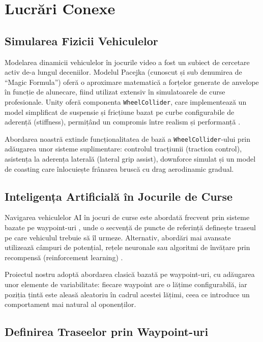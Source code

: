 \section{Lucrări Conexe}
\label{sec:related_work}

\subsection{Simularea Fizicii Vehiculelor}

Modelarea dinamicii vehiculelor în jocurile video a fost un subiect de cercetare activ de-a lungul deceniilor. Modelul Pacejka (cunoscut și sub denumirea de ``Magic Formula'') \cite{pacejka2012tire} oferă o aproximare matematică a forțelor generate de anvelope în funcție de alunecare, fiind utilizat extensiv în simulatoarele de curse profesionale. Unity oferă componenta \texttt{WheelCollider}, care implementează un model simplificat de suspensie și fricțiune bazat pe curbe configurabile de aderență (stiffness), permițând un compromis între realism și performanță \cite{unity_manual_wheelcollider}.

Abordarea noastră extinde funcționalitatea de bază a \texttt{WheelCollider}-ului prin adăugarea unor sisteme suplimentare: controlul tracțiunii (traction control), asistența la aderența laterală (lateral grip assist), downforce simulat și un model de coasting care înlocuiește frânarea bruscă cu drag aerodinamic gradual.

\subsection{Inteligența Artificială în Jocurile de Curse}

Navigarea vehiculelor AI în jocuri de curse este abordată frecvent prin sisteme bazate pe waypoint-uri \cite{rabin2009introduction}, unde o secvență de puncte de referință definește traseul pe care vehiculul trebuie să îl urmeze. Alternativ, abordări mai avansate utilizează câmpuri de potențial, rețele neuronale sau algoritmi de învățare prin recompensă (reinforcement learning) \cite{julian2019deep}.

Proiectul nostru adoptă abordarea clasică bazată pe waypoint-uri, cu adăugarea unor elemente de variabilitate: fiecare waypoint are o lățime configurabilă, iar poziția țintă este aleasă aleatoriu în cadrul acestei lățimi, ceea ce introduce un comportament mai natural al oponenților.

\subsection{Definirea Traseelor prin Waypoint-uri}

